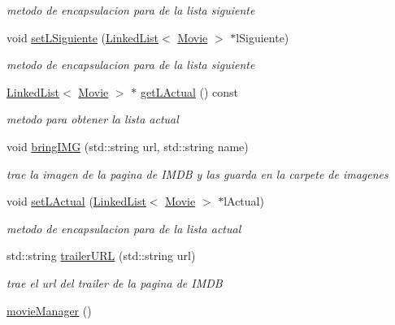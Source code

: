 \begin{DoxyCompactItemize}
\begin{DoxyCompactList}\small\item\em metodo de encapsulacion para de la lista siguiente \end{DoxyCompactList}\item 
void \hyperlink{classmovieManager_a4999bd13bacc795fc47d7d8e97bfb0bf}{set\+L\+Siguiente} (\hyperlink{classLinkedList}{Linked\+List}$<$ \hyperlink{classMovie}{Movie} $>$ $\ast$l\+Siguiente)
\begin{DoxyCompactList}\small\item\em metodo de encapsulacion para de la lista siguiente \end{DoxyCompactList}\item 
\hyperlink{classLinkedList}{Linked\+List}$<$ \hyperlink{classMovie}{Movie} $>$ $\ast$ \hyperlink{classmovieManager_a44bc51d4c17f68a40ed227fefbafff06}{get\+L\+Actual} () const
\begin{DoxyCompactList}\small\item\em metodo para obtener la lista actual \end{DoxyCompactList}\item 
void \hyperlink{classmovieManager_a8cb457bede5df92164c3908b2905caf6}{bring\+I\+MG} (std\+::string url, std\+::string name)
\begin{DoxyCompactList}\small\item\em trae la imagen de la pagina de I\+M\+DB y las guarda en la carpete de imagenes \end{DoxyCompactList}\item 
void \hyperlink{classmovieManager_a6a9aaf1eca1abe828713c2b12a00ab44}{set\+L\+Actual} (\hyperlink{classLinkedList}{Linked\+List}$<$ \hyperlink{classMovie}{Movie} $>$ $\ast$l\+Actual)
\begin{DoxyCompactList}\small\item\em metodo de encapsulacion para de la lista actual \end{DoxyCompactList}\item 
std\+::string \hyperlink{classmovieManager_a3de32f2e1d6167109699012d12e7051a}{trailer\+U\+RL} (std\+::string url)
\begin{DoxyCompactList}\small\item\em trae el url del trailer de la pagina de I\+M\+DB \end{DoxyCompactList}\item 
\mbox{\label{classmovieManager_a1e545ec9cea70e6fdab2141492d343c8}} 
\hyperlink{classmovieManager_a1e545ec9cea70e6fdab2141492d343c8}{movie\+Manager} ()

\end{DoxyCompactItemize}

